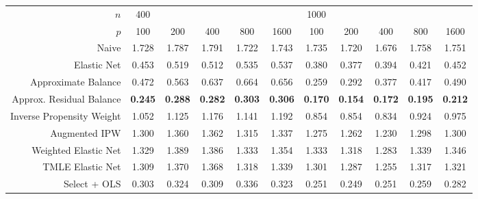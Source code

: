 \begin{table}[ht]
\centering
\begin{tabular}{|r|ccccc|ccccc|}
   \hline
$n$ & 400 &  &  &  &  & 1000 &  &  &  &  \\ 
  $p$ & 100 & 200 & 400 & 800 & 1600 & 100 & 200 & 400 & 800 & 1600 \\ 
   \hline
Naive & 1.728 & 1.787 & 1.791 & 1.722 & 1.743 & 1.735 & 1.720 & 1.676 & 1.758 & 1.751 \\ 
  Elastic Net & 0.453 & 0.519 & 0.512 & 0.535 & 0.537 & 0.380 & 0.377 & 0.394 & 0.421 & 0.452 \\ 
   \hline
Approximate Balance & 0.472 & 0.563 & 0.637 & 0.664 & 0.656 & 0.259 & 0.292 & 0.377 & 0.417 & 0.490 \\ 
  Approx. Residual Balance &  \bf 0.245 &  \bf 0.288 &  \bf 0.282 &  \bf 0.303 &  \bf 0.306 &  \bf 0.170 &  \bf 0.154 &  \bf 0.172 &  \bf 0.195 &  \bf 0.212 \\ 
   \hline
Inverse Propensity Weight & 1.052 & 1.125 & 1.176 & 1.141 & 1.192 & 0.854 & 0.854 & 0.834 & 0.924 & 0.975 \\ 
  Augmented IPW & 1.300 & 1.360 & 1.362 & 1.315 & 1.337 & 1.275 & 1.262 & 1.230 & 1.298 & 1.300 \\ 
   \hline
Weighted Elastic Net & 1.329 & 1.389 & 1.386 & 1.333 & 1.354 & 1.333 & 1.318 & 1.283 & 1.339 & 1.346 \\ 
  TMLE Elastic Net & 1.309 & 1.370 & 1.368 & 1.318 & 1.339 & 1.301 & 1.287 & 1.255 & 1.317 & 1.321 \\ 
   \hline
Select + OLS & 0.303 & 0.324 & 0.309 & 0.336 & 0.323 & 0.251 & 0.249 & 0.251 & 0.259 & 0.282 \\ 
   \hline
\end{tabular}
\end{table}
